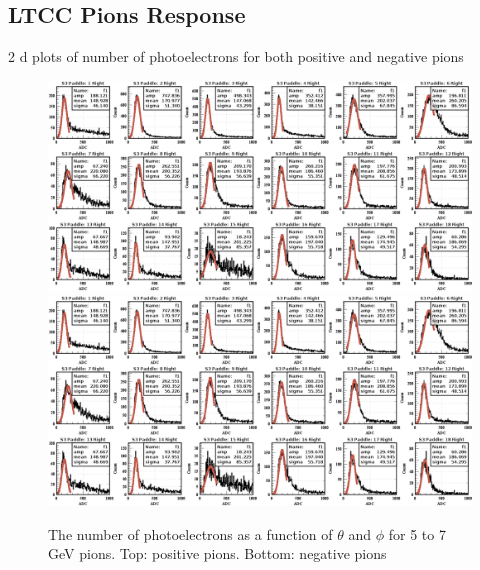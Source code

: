 \subsection{LTCC Pions Response}

2 d plots of number of photoelectrons for both positive and negative pions


\begin{figure}
	\centering
	\includegraphics[width=0.98\columnwidth,keepaspectratio]{img/pipnphe.png}
	\includegraphics[width=0.98\columnwidth,keepaspectratio]{img/pimnphe.png}
	\caption{The number of photoelectrons as a function of $\theta$ and $\phi$ for 5 to 7 GeV pions. Top: positive pions. Bottom: negative pions}
	\label{fig:neutronMM}
\end{figure}



